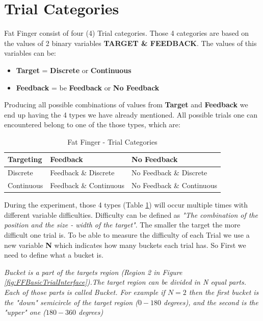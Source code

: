 \section{Trial Categories}

Fat Finger consist of four (4) Trial categories. Those 4 categories are based on the values of 2 binary variables \textbf{TARGET \& FEEDBACK}. The values of this variables can be:
\begin{itemize}
	\item \textbf{Target} = \textbf{Discrete} or \textbf{Continuous}
	\item \textbf{Feedback} = be \textbf{Feedback} or \textbf{No Feedback}
\end{itemize}

Producing all possible combinations of values from \textbf{Target} and \textbf{Feedback} we end up having the 4 types we have already mentioned. All possible trials one can encountered belong to one of the those types, which are:


\begin{table}[H]
\centering
\begin{tabular}{l || l | l}
Targeting & Feedback & No Feedback \\
\hline \hline
Discrete & Feedback \& Discrete &  No Feedback \& Discrete\\
Continuous & Feedback \& Continuous & No Feedback \& Continuous
\end{tabular}
\caption{Fat Finger - Trial Categories}
\label{tab:ffTrialCateg}
\end{table}

During the experiment, those 4 types (Table \ref{tab:ffTrialCateg}) will occur multiple times with different variable difficulties. Difficulty can be defined as \emph{"The combination of the position and the size - width of the target"}. The smaller the target the more difficult one trial is. To be able to measure the difficulty of each Trial we use a new variable \textbf{N} which indicates how many buckets each trial has. So First we need to define what a bucket is.

\emph{Bucket is a part of the targets region (Region 2 in Figure \ref{fig:FFBasicTrialInterface}).The target region can be divided in N equal parts. Each of those parts is called Bucket. For example if $N=2$ then the first bucket is the "down" semicircle of the target region ($0-180$ degrees), and the second is the "upper" one ($180-360$ degrees)}

